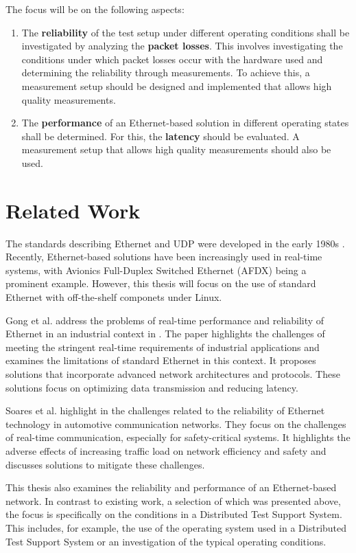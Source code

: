  The focus will be on the following aspects:

\begin{enumerate}[label=\arabic*.]
    \item The \textbf{reliability} of the test setup under different operating conditions shall be investigated by analyzing the \textbf{packet losses}. This involves investigating the conditions under which packet losses occur with the hardware used and determining the reliability through measurements. To achieve this, a measurement setup should be designed and implemented that allows high quality measurements.
    \item The \textbf{performance} of an Ethernet-based solution in different operating states shall be determined. For this, the \textbf{latency} should be evaluated. A measurement setup that allows high quality measurements should also be used.
\end{enumerate}


\section{Related Work} \label{chap:introduction:related_work}
The standards describing Ethernet and UDP were developed in the early 1980s \cite{introRelW01}. Recently, Ethernet-based solutions have been increasingly used in real-time systems, with Avionics Full-Duplex Switched Ethernet (AFDX) being a prominent example. However, this thesis will focus on the use of standard Ethernet with off-the-shelf componets under Linux.

Gong et al. address the problems of real-time performance and reliability of Ethernet in an industrial context in \cite{introRelW02}. The paper highlights the challenges of meeting the stringent real-time requirements of industrial applications and examines the limitations of standard Ethernet in this context. It proposes solutions that incorporate advanced network architectures and protocols. These solutions focus on optimizing data transmission and reducing latency.

Soares et al. highlight in \cite{introRelW03} the challenges related to the reliability of Ethernet technology in automotive communication networks. They focus on the challenges of real-time communication, especially for safety-critical systems. It highlights the adverse effects of increasing traffic load on network efficiency and safety and discusses solutions to mitigate these challenges.

This thesis also examines the reliability and performance of an Ethernet-based network. In contrast to existing work, a selection of which was presented above, the focus is specifically on the conditions in a Distributed Test Support System. This includes, for example, the use of the operating system used in a Distributed Test Support System or an investigation of the typical operating conditions.